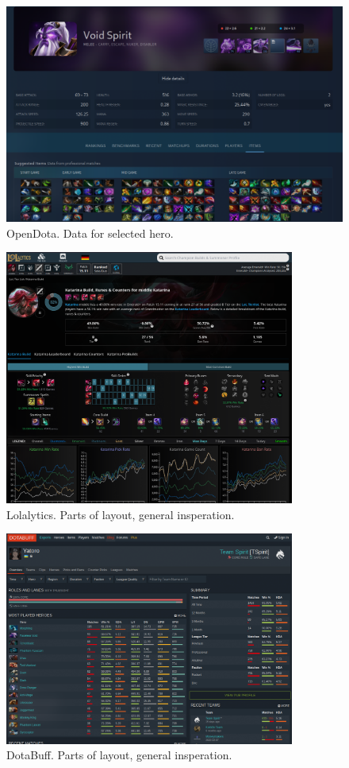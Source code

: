     \begin{figure}[ht]
        \centering
        \includegraphics[width=1\textwidth]{images/references/OpenDota2}
        \caption{OpenDota. Data for selected hero.}
    \end{figure}

    \begin{figure}[ht]
        \centering
        \includegraphics[width=0.85\textwidth]{images/references/Lolalytics}
        \caption{Lolalytics. Parts of layout, general insperation.}
    \end{figure}

    \begin{figure}[ht]
        \centering
        \includegraphics[width=0.85\textwidth]{images/references/DotaBuff}
        \caption{DotaBuff. Parts of layout, general insperation.}
    \end{figure}


    \clearpage

